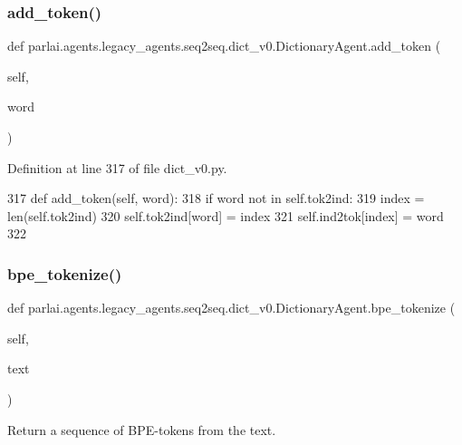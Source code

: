 \subsubsection{\texorpdfstring{add\+\_\+token()}{add\_token()}}
{\footnotesize\ttfamily def parlai.\+agents.\+legacy\+\_\+agents.\+seq2seq.\+dict\+\_\+v0.\+Dictionary\+Agent.\+add\+\_\+token (\begin{DoxyParamCaption}\item[{}]{self,  }\item[{}]{word }\end{DoxyParamCaption})}



Definition at line 317 of file dict\+\_\+v0.\+py.


\begin{DoxyCode}
317     \textcolor{keyword}{def }add\_token(self, word):
318         \textcolor{keywordflow}{if} word \textcolor{keywordflow}{not} \textcolor{keywordflow}{in} self.tok2ind:
319             index = len(self.tok2ind)
320             self.tok2ind[word] = index
321             self.ind2tok[index] = word
322 
\end{DoxyCode}
\mbox{\label{classparlai_1_1agents_1_1legacy__agents_1_1seq2seq_1_1dict__v0_1_1DictionaryAgent_a7ccda0fb5cabe49fc68551da6fe03bff}} 
\subsubsection{\texorpdfstring{bpe\+\_\+tokenize()}{bpe\_tokenize()}}
{\footnotesize\ttfamily def parlai.\+agents.\+legacy\+\_\+agents.\+seq2seq.\+dict\+\_\+v0.\+Dictionary\+Agent.\+bpe\+\_\+tokenize (\begin{DoxyParamCaption}\item[{}]{self,  }\item[{}]{text }\end{DoxyParamCaption})}

\begin{DoxyVerb}Return a sequence of BPE-tokens from the text.
\end{DoxyVerb}
 

